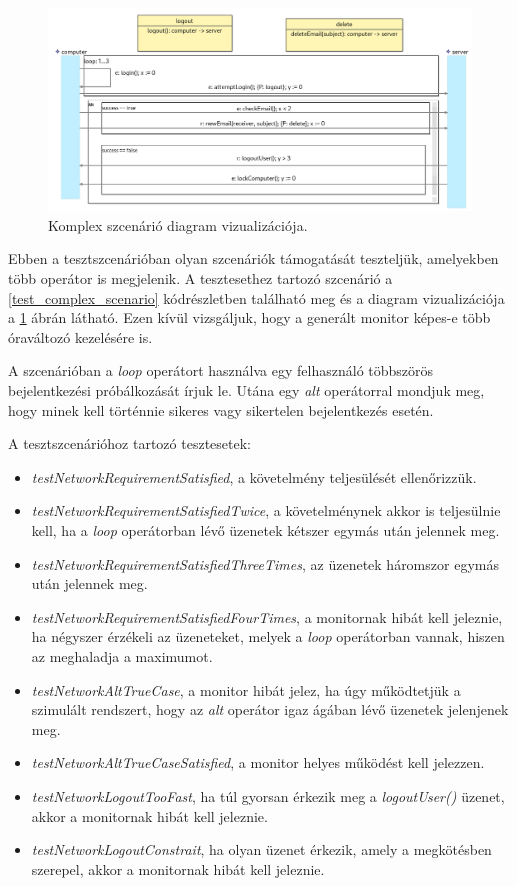 \begin{figure}[!ht]
    \centering
    \includegraphics[width=160mm, keepaspectratio]{figures/diagramOperatorExample.png}
    \caption{Komplex szcenárió diagram vizualizációja.}
    \label{test_complex_diagram}
\end{figure}

Ebben a tesztszcenárióban olyan szcenáriók támogatását teszteljük, amelyekben több operátor is megjelenik.
A tesztesethez tartozó szcenárió a \ref{test_complex_scenario} kódrészletben található meg és a diagram vizualizációja a \ref{test_complex_diagram} ábrán látható.
Ezen kívül vizsgáljuk, hogy a generált monitor képes-e több óraváltozó kezelésére is.

A szcenárióban a \textit{loop} operátort használva egy felhasználó többszörös bejelentkezési próbálkozását írjuk le.
Utána egy \textit{alt} operátorral mondjuk meg, hogy minek kell történnie sikeres vagy sikertelen bejelentkezés esetén.

A tesztszcenárióhoz tartozó tesztesetek:
\begin{itemize}
    \item \textit{testNetworkRequirementSatisfied}, a követelmény teljesülését ellenőrizzük.
    \item \textit{testNetworkRequirementSatisfiedTwice}, a követelménynek akkor is teljesülnie kell, ha a \textit{loop} operátorban lévő üzenetek kétszer egymás után jelennek meg.
    \item \textit{testNetworkRequirementSatisfiedThreeTimes}, az üzenetek háromszor egymás után jelennek meg.
    \item \textit{testNetworkRequirementSatisfiedFourTimes}, a monitornak hibát kell jeleznie, ha négyszer érzékeli az üzeneteket, melyek a \textit{loop} operátorban vannak, hiszen az meghaladja a maximumot.
    \item \textit{testNetworkAltTrueCase}, a monitor hibát jelez, ha úgy működtetjük a szimulált rendszert, hogy az \textit{alt} operátor igaz ágában lévő üzenetek jelenjenek meg.
    \item \textit{testNetworkAltTrueCaseSatisfied}, a monitor helyes működést kell jelezzen.
    \item \textit{testNetworkLogoutTooFast}, ha túl gyorsan érkezik meg a \textit{logoutUser()} üzenet, akkor a monitornak hibát kell jeleznie.
    \item \textit{testNetworkLogoutConstrait}, ha olyan üzenet érkezik, amely a megkötésben szerepel, akkor a monitornak hibát kell jeleznie.
\end{itemize}

